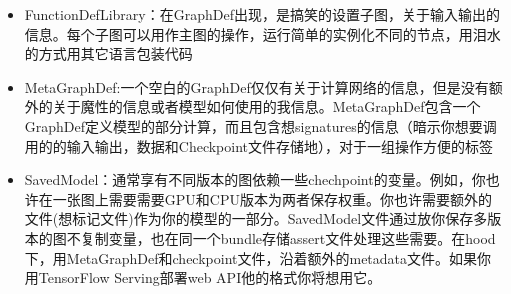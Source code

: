 \begin{itemize}
\item FunctionDefLibrary：在GraphDef出现，是搞笑的设置子图，关于输入输出的信息。每个子图可以用作主图的操作，运行简单的实例化不同的节点，用泪水的方式用其它语言包装代码
\item MetaGraphDef:一个空白的GraphDef仅仅有关于计算网络的信息，但是没有额外的关于魔性的信息或者模型如何使用的我信息。MetaGraphDef包含一个GraphDef定义模型的部分计算，而且包含想signatures的信息（暗示你想要调用的的输入输出，数据和Checkpoint文件存储地），对于一组操作方便的标签
\item SavedModel：通常享有不同版本的图依赖一些chechpoint的变量。例如，你也许在一张图上需要需要GPU和CPU版本为两者保存权重。你也许需要额外的文件(想标记文件)作为你的模型的一部分。SavedModel文件通过放你保存多版本的图不复制变量，也在同一个bundle存储assert文件处理这些需要。在hood下，用MetaGraphDef和checkpoint文件，沿着额外的metadata文件。如果你用TensorFlow Serving部署web API他的格式你将想用它。
\end{itemize}
